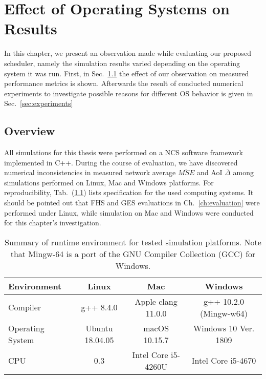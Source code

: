 \chapter{Effect of Operating Systems on Results}

In this chapter, we present an observation made while evaluating our proposed
scheduler, namely the simulation results varied depending on the operating
system it was run. First, in Sec.~\ref{sec:effect} the effect of our observation
on measured performance metrics is shown. Afterwards the result of conducted
numerical experiments to investigate possible reasons for different OS behavior
is given in Sec.~\ref{sec:experiments}

\section{Overview} \label{sec:effect}

All simulations for this thesis were performed on a NCS software framework
implemented in C++\footnotemark. During the course of evaluation, we have
discovered numerical inconsistencies in measured network average
$\overline{MSE}$ and AoI $\overline{\Delta}$ among simulations performed on
Linux, Mac and Windows platforms. For reproducibility, Tab.~(\ref{tab:specs})
lists specification for the used computing systems. It should be pointed out
that FHS and GES evaluations in Ch.~\ref{ch:evaluation} were performed under
Linux, while simulation on Mac and Windows were conducted for this chapter's
investigation.

\begin{table}[b]
  \begin{center}
  \begin{tabular}{|l|c|c|c|} 
  \hline
  \textbf{Environment} & \textbf{Linux} & \textbf{Mac} & \textbf{Windows} \\
  \hline \hline
  Compiler & g++ 8.4.0 & Apple clang 11.0.0 & g++ 10.2.0 (Mingw-w64) \\ 
  Operating System & Ubuntu 18.04.05 & macOS 10.15.7 & Windows 10 Ver. 1809 \\ 
  CPU & 0.3 & Intel Core i5-4260U & Intel Core i5-4670 \\
  \hline
  \end{tabular}
  \caption[Summary of runtime environment for tested simulation
  platforms]{Summary of runtime environment for tested simulation platforms.
  Note that Mingw-64 is a port of the GNU Compiler Collection (GCC) for
  Windows.}
  \label{tab:specs}
  \end{center}
\end{table}

